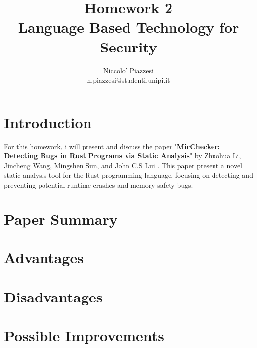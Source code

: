 \documentclass{article}
\title{Homework 2 \\ Language Based Technology for Security}
\author{Niccolo' Piazzesi \\ n.piazzesi@studenti.unipi.it}
\begin{document}
\maketitle

\section*{Introduction}
For this homework, i will present and discuss the paper "\textbf{MirChecker: Detecting Bugs in Rust Programs via Static Analysis}" by 
Zhuohua Li, Jincheng Wang, Mingshen Sun, and John C.S Lui \cite{li2021mirchecker}. This paper present a novel static analysis tool for the Rust programming language, 
focusing on detecting and preventing potential runtime crashes and memory safety bugs.
\section*{Paper Summary}


\section*{Advantages}

\section*{Disadvantages}

\section*{Possible Improvements}



\end{document}
